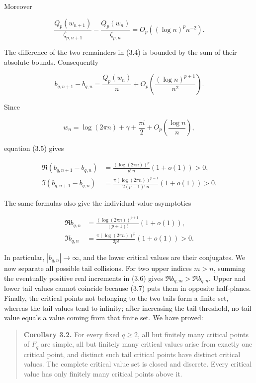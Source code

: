 Moreover

\[
 \frac{Q_p(w_{n+1})}{\zeta_{p,n+1}}
 -\frac{Q_p(w_n)}{\zeta_{p,n}}
 =O_p((\log n)^p n^{-2}).
\]

The difference of the two remainders in (3.4) is bounded by the sum of
their absolute bounds. Consequently

\[
 b_{q,n+1}-b_{q,n}
 =\frac{Q_p(w_n)}n
 +O_p\!\left(\frac{(\log n)^{p+1}}{n^2}\right).
\tag{Inv-3.5}
\]

Since

\[
 w_n=\log(2\pi n)+\gamma+\frac{\pi i}{2}
 +O_p\!\left(\frac{\log n}{n}\right),
\]

equation (3.5) gives

\[
 \begin{aligned}
 \Re(b_{q,n+1}-b_{q,n})
 &=\frac{(\log(2\pi n))^p}{p!\,n}(1+o(1))>0,\\
 \Im(b_{q,n+1}-b_{q,n})
 &=\frac{\pi(\log(2\pi n))^{p-1}}
 {2(p-1)!\,n}(1+o(1))>0.
 \end{aligned}
\tag{Inv-3.6}
\]

The same formulas also give the individual-value asymptotics

\[
 \begin{aligned}
 \Re b_{q,n}
 &=\frac{(\log(2\pi n))^{p+1}}{(p+1)!}(1+o(1)),\\
 \Im b_{q,n}
 &=\frac{\pi(\log(2\pi n))^p}{2p!}(1+o(1))>0.
 \end{aligned}
\tag{Inv-3.7}
\]

In particular, \(|b_{q,n}|\to\infty\), and the lower critical values are
their conjugates. We now separate all possible tail collisions. For two
upper indices \(m>n\), summing the eventually positive real increments in
(3.6) gives \(\Re b_{q,m}>\Re b_{q,n}\). Upper and lower tail values cannot
coincide because (3.7) puts them in opposite half-planes. Finally, the
critical points not belonging to the two tails form a finite set, whereas
the tail values tend to infinity; after increasing the tail threshold, no
tail value equals a value coming from that finite set. We have proved:

\begin{quote}
\textbf{Corollary 3.2.} For every fixed \(q\geq2\), all but finitely many
critical points of \(F_q\) are simple, all but finitely many critical
values arise from exactly one critical point, and distinct such tail
critical points have distinct critical values. The complete critical
value set is closed and discrete. Every critical value has only finitely
many critical points above it.
\end{quote}

